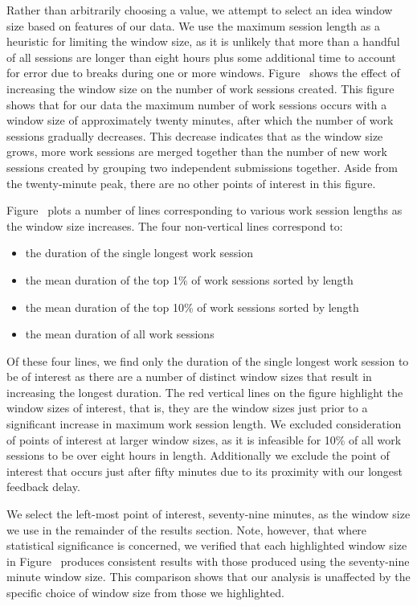 Rather than arbitrarily choosing a value, we attempt to select an idea window
size based on features of our data. We use the maximum session length as a
heuristic for limiting the window size, as it is unlikely that more than a
handful of all sessions are longer than eight hours plus some additional time
to account for error due to breaks during one or more
windows. Figure~ shows the effect of increasing the
window size on the number of work sessions created. This figure shows that for
our data the maximum number of work sessions occurs with a window size of
approximately twenty minutes, after which the number of work sessions gradually
decreases. This decrease indicates that as the window size grows, more work
sessions are merged together than the number of new work sessions created by
grouping two independent submissions together. Aside from the twenty-minute
peak, there are no other points of interest in this figure.

Figure~ plots a number of lines corresponding to
various work session lengths as the window size increases. The four
non-vertical lines correspond to:

\begin{itemize}
\item the duration of the single longest work session
\item the mean duration of the top 1\% of work sessions sorted by length
\item the mean duration of the top 10\% of work sessions sorted by length
\item the mean duration of all work sessions
\end{itemize}

Of these four lines, we find only the duration of the single longest work
session to be of interest as there are a number of distinct window sizes that
result in increasing the longest duration. The red vertical lines on the figure
highlight the window sizes of interest, that is, they are the window sizes just
prior to a significant increase in maximum work session length. We excluded
consideration of points of interest at larger window sizes, as it is infeasible
for 10\% of all work sessions to be over eight hours in length. Additionally we
exclude the point of interest that occurs just after fifty minutes due to its
proximity with our longest feedback delay.

We select the left-most point of interest, seventy-nine minutes, as the window
size we use in the remainder of the results section. Note, however, that where
statistical significance is concerned, we verified that each highlighted window
size in Figure~ produces consistent results with
those produced using the seventy-nine minute window size. This comparison shows
that our analysis is unaffected by the specific choice of window size from
those we highlighted.

